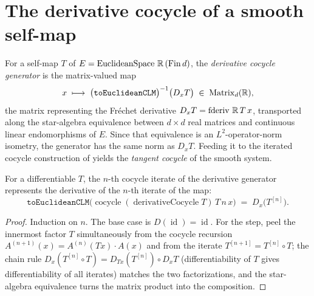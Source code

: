 \section{The derivative cocycle of a smooth self-map}

\begin{definition}\label{derivativeCocycle}
  \leanok
  For a self-map \(T\) of \(E = \operatorname{EuclideanSpace}\,\mathbb{R}\,(\operatorname{Fin} d)\), the
  \emph{derivative cocycle generator} is the matrix-valued map
  \[
    x \;\longmapsto\; \bigl(\texttt{toEuclideanCLM}\bigr)^{-1}\bigl(D_xT\bigr)
      \;\in\; \operatorname{Matrix}_{d}(\mathbb{R}),
  \]
  the matrix representing the Fr\'echet derivative \(D_xT = \operatorname{fderiv}\,\mathbb{R}\,T\,x\),
  transported along the star-algebra equivalence between \(d\times d\) real matrices and
  continuous linear endomorphisms of \(E\). Since that equivalence is an \(L^2\)-operator-norm
  isometry, the generator has the same norm as \(D_xT\). Feeding it to the iterated cocycle
  construction of  yields the \emph{tangent cocycle} of the smooth system.
\end{definition}

\begin{theorem}\label{chainRule_cocycle}
  \leanok
  For a differentiable \(T\), the \(n\)-th cocycle iterate of the derivative generator represents
  the derivative of the \(n\)-th iterate of the map:
  \[
    \texttt{toEuclideanCLM}\bigl(\operatorname{cocycle}(\operatorname{derivativeCocycle} T)\,T\,n\,x\bigr)
      \;=\; D_x\bigl(T^{[n]}\bigr) .
  \]
\end{theorem}
\begin{proof}\leanok
  Induction on \(n\). The base case is \(D(\operatorname{id}) = \operatorname{id}\). For the step,
  peel the innermost factor \(T\) simultaneously from the cocycle recursion
  \(A^{(n+1)}(x) = A^{(n)}(Tx)\cdot A(x)\) and from the iterate
  \(T^{[n+1]} = T^{[n]}\circ T\); the chain rule
  \(D_x(T^{[n]}\circ T) = D_{Tx}(T^{[n]})\circ D_xT\) (differentiability of \(T\) gives
  differentiability of all iterates) matches the two factorizations, and the star-algebra
  equivalence turns the matrix product into the composition.
\end{proof}

